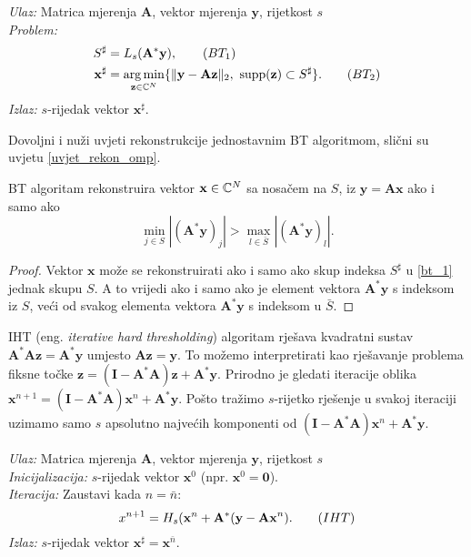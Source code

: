 \documentclass[a4paper,twoside,12pt]{memoir} %
\newcommand{\vect}[1]{\mathbf{#1}}
\renewcommand{\vec}{\vect}
\newcommand{\supp}{\text{\normalfont{supp}}}
\newcommand{\norm}[1]{\|{#1}\|}
\DeclareMathOperator*{\argmin}{arg\,min}
\newenvironment{alg}[1]
{
    \bigskip
    \begin{tcolorbox}[arc=0mm,boxrule=1.2pt,colframe=black,colback=white,detach title, before upper={\medskip\begin{center}\textbf{#1}\end{center}\hline\newline\medskip},frame hidden]
    \medskip
}
{
    \medskip
\end{tcolorbox}
    \bigskip
}
\begin{document}
\begin{alg}{BT}
    \textit{Ulaz:} Matrica mjerenja $\vec A$, vektor mjerenja $\vec y$, rijetkost $s$ \\
    \textit{Problem:}
        \begin{align*}
            S^{\sharp} &= L_s(\vec A^* \vec y),\tag{$BT_1$}\label{bt_1}\\
            \vec x^{\sharp} &= \argmin_{\vec z \in \C^N}\{\norm{\vec y - \vec{Az}}_2,\ \supp(\vec z) \subset S^{\sharp}\}.\tag{$BT_2$}\label{bt_2}\\
        \end{align*}
        \textit{Izlaz:} $s$-rijedak vektor $\vec x^{\sharp}$.
\end{alg}

\noindent Dovoljni i nu\v{z}i uvjeti rekonstrukcije jednostavnim BT algoritmom, sli\v{c}ni su uvjetu \eqref{uvjet_rekon_omp}.
\begin{prop}
    BT algoritam rekonstruira vektor $\vec x \in \C^N$ sa nosa\v{c}em na $S$, iz $\vec y = \vec{Ax}$ ako i samo ako
    \begin{equation}\label{bt_uvjet}
        \min_{j \in S}|(\vec A^* \vec y)_j| > \max_{l \in \bar{S}} |(\vec A^* \vec y)_l| .
    \end{equation}
\end{prop}
\begin{proof}
    Vektor $\vec x$ mo\v{z}e se rekonstruirati ako i samo ako skup indeksa $S^{\sharp}$ u \eqref{bt_1} jednak skupu $S$. A to vrijedi ako i samo ako je element vektora $\vec A^* \vec y$ s indeksom iz $S$, ve\'ci od svakog elementa vektora $\vec A^* \vec y$ s indeksom u $\bar{S}$.
\end{proof}
\indent
IHT (eng. \textit{iterative hard thresholding}) algoritam rje\v{s}ava kvadratni sustav $\vec A^* \vec A \vec z= \vec A^* \vec y$ umjesto $\vec{Az}=\vec y$. To mo\v{z}emo interpretirati kao rje\v{s}avanje problema fiksne to\v{c}ke $\vec z = (\vec{I}- \vec A^* \vec A ) \vec z + \vec A^* \vec y$. Prirodno je gledati iteracije oblika $\vec x^{n+1} = (\vec{I}- \vec A^* \vec A) \vec x^n + \vec A^* \vec y$. Po\v{s}to tra\v{z}imo $s$-rijetko rje\v{s}enje u svakoj iteraciji uzimamo samo $s$ apsolutno najve\'cih komponenti od $(\vec{I} - \vec A^* \vec A ) \vec x^n + \vec A^* \vec y$.

\begin{alg}{IHT}
    \textit{Ulaz:} Matrica mjerenja $\vec A$, vektor mjerenja $\vec y$, rijetkost $s$ \\
    \textit{Inicijalizacija:} $s$-rijedak vektor $\vec x^0$ (npr. $\vec x^0 = \vec 0$).\\
    \textit{Iteracija:} Zaustavi kada $n = \bar{n}$:
        \begin{equation}
            x^{n+1} = H_s(\vec x^n + \vec A^* (\vec y - \vec{Ax}^n).\tag{$IHT$}\label{iht}\\
        \end{equation}
        \textit{Izlaz:} $s$-rijedak vektor $\vec x^{\sharp}=\vec x^{\bar n}$.
\end{alg}
\end{document}
